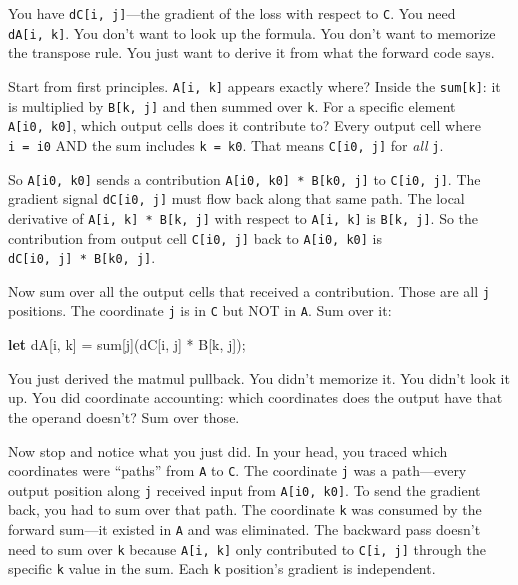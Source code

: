 \documentclass[11pt,titlepage]{article}
\newenvironment{Shaded}{}{}
\newcommand{\KeywordTok}[1]{\textcolor[rgb]{0.00,0.44,0.13}{\textbf{#1}}}
\newcommand{\NormalTok}[1]{#1}
\newcommand{\OperatorTok}[1]{\textcolor[rgb]{0.40,0.40,0.40}{#1}}
\begin{document}
You have \texttt{dC{[}i,\ j{]}}---the gradient of the loss with respect
to \texttt{C}. You need \texttt{dA{[}i,\ k{]}}. You don't want to look
up the formula. You don't want to memorize the transpose rule. You just
want to derive it from what the forward code says.

Start from first principles. \texttt{A{[}i,\ k{]}} appears exactly
where? Inside the \texttt{sum{[}k{]}}: it is multiplied by
\texttt{B{[}k,\ j{]}} and then summed over \texttt{k}. For a specific
element \texttt{A{[}i0,\ k0{]}}, which output cells does it contribute
to? Every output cell where \texttt{i\ =\ i0} AND the sum includes
\texttt{k\ =\ k0}. That means \texttt{C{[}i0,\ j{]}} for \emph{all}
\texttt{j}.

So \texttt{A{[}i0,\ k0{]}} sends a contribution
\texttt{A{[}i0,\ k0{]}\ *\ B{[}k0,\ j{]}} to \texttt{C{[}i0,\ j{]}}. The
gradient signal \texttt{dC{[}i0,\ j{]}} must flow back along that same
path. The local derivative of \texttt{A{[}i,\ k{]}\ *\ B{[}k,\ j{]}}
with respect to \texttt{A{[}i,\ k{]}} is \texttt{B{[}k,\ j{]}}. So the
contribution from output cell \texttt{C{[}i0,\ j{]}} back to
\texttt{A{[}i0,\ k0{]}} is \texttt{dC{[}i0,\ j{]}\ *\ B{[}k0,\ j{]}}.

Now sum over all the output cells that received a contribution. Those
are all \texttt{j} positions. The coordinate \texttt{j} is in \texttt{C}
but NOT in \texttt{A}. Sum over it:

\begin{Shaded}
\begin{Highlighting}[]
\KeywordTok{let}\NormalTok{ dA}\OperatorTok{[}\NormalTok{i, k}\OperatorTok{]}\NormalTok{ = sum}\OperatorTok{[}\NormalTok{j}\OperatorTok{]}\NormalTok{(dC}\OperatorTok{[}\NormalTok{i, j}\OperatorTok{]}\NormalTok{ * B}\OperatorTok{[}\NormalTok{k, j}\OperatorTok{]}\NormalTok{);}
\end{Highlighting}
\end{Shaded}

You just derived the matmul pullback. You didn't memorize it. You didn't
look it up. You did coordinate accounting: which coordinates does the
output have that the operand doesn't? Sum over those.

Now stop and notice what you just did. In your head, you traced which
coordinates were ``paths'' from \texttt{A} to \texttt{C}. The coordinate
\texttt{j} was a path---every output position along \texttt{j} received
input from \texttt{A{[}i0,\ k0{]}}. To send the gradient back, you had
to sum over that path. The coordinate \texttt{k} was consumed by the
forward sum---it existed in \texttt{A} and was eliminated. The backward
pass doesn't need to sum over \texttt{k} because \texttt{A{[}i,\ k{]}}
only contributed to \texttt{C{[}i,\ j{]}} through the specific
\texttt{k} value in the sum. Each \texttt{k} position's gradient is
independent.
\end{document}
